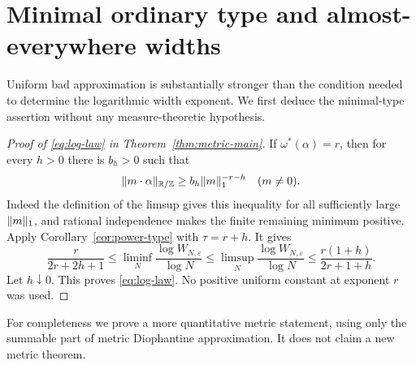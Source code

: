 \section{Minimal ordinary type and almost-everywhere widths}\label{sec:metric}
Uniform bad approximation is substantially stronger than the condition needed to determine the logarithmic width exponent. We first deduce the minimal-type assertion without any measure-theoretic hypothesis.

\begin{proof}[Proof of \eqref{eq:log-law} in Theorem~\ref{thm:metric-main}]
If $\omega^*(\alpha)=r$, then for every $h>0$ there is $b_h>0$ such that
\[
 \lVert m\cdot\alpha\rVert_{\mathbb R/\mathbb Z}\ge b_h\lVert m\rVert_1^{-r-h}
                          \quad(m\ne0).
\]
Indeed the definition of the limsup gives this inequality for all sufficiently large $\lVert m\rVert_1$, and rational independence makes the finite remaining minimum positive. Apply Corollary~\ref{cor:power-type} with $\tau=r+h$. It gives
\[
 \frac{r}{2r+2h+1}\le
 \liminf_N\frac{\log W_{N,\varepsilon}}{\log N}
 \le\limsup_N\frac{\log W_{N,\varepsilon}}{\log N}
 \le\frac{r(1+h)}{2r+1+h}.
\]
Let $h\downarrow0$. This proves \eqref{eq:log-law}. No positive uniform constant at exponent $r$ was used.
\end{proof}

For completeness we prove a more quantitative metric statement, using only the summable part of metric Diophantine approximation. It does not claim a new metric theorem.

